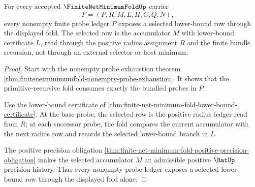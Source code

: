 \begin{theorem}
\label{thm:finite-net-minimum-fold-selector-totality}
For every accepted $\FiniteNetMinimumFoldUp$ carrier
$$
F=(P,R,M,L,H,C,Q,N),
$$
every nonempty finite probe ledger $P$ exposes a selected lower-bound row through the displayed fold. The selected row is the accumulator $M$ with lower-bound certificate $L$, read through the positive radius assignment $R$ and the finite bundle recursion, not through an external selector or host minimum.
\end{theorem}
\begin{proof}
Start with the nonempty probe exhaustion theorem \autoref{thm:finitenetminimumfold-nonempty-probe-exhaustion}. It shows that the primitive-recursive fold consumes exactly the bundled probes in $P$.

Use the lower-bound certificate of \autoref{thm:finite-net-minimum-fold-lower-bound-certificate}. At the base probe, the selected row is the positive radius ledger read from $R$; at each successor probe, the fold compares the current accumulator with the next radius row and records the selected lower-bound branch in $L$.

The positive precision obligation \autoref{thm:finite-net-minimum-fold-positive-precision-obligation} makes the selected accumulator $M$ an admissible positive $\RatUp$ precision history. Thus every nonempty probe ledger exposes a selected lower-bound row through the displayed fold alone.
\end{proof}

